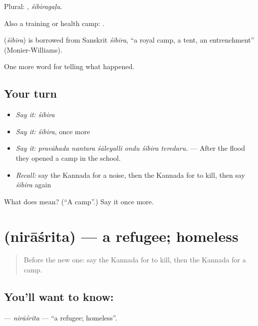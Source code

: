 Plural: , \emph{śibiragaḷu}.

Also a training or health camp:  .

\begin{cousinweb}
\textbf{} (\emph{śibira}) is borrowed from Sanskrit \emph{śibira}, \textquotedblleft{}a royal camp, a tent, an entrenchment\textquotedblright{} (Monier-Williams).
\end{cousinweb}

\begin{grammarlens}[title={What you've built}]
One more word for telling what happened.
\end{grammarlens}

\subsection*{Your turn}
\begin{itemize}
\raggedright
  \item \emph{Say it:} \emph{śibira}
  \item \emph{Say it:} \emph{śibira}, once more
  \item \emph{Say it:} \emph{pravāhada nantara śāleyalli ondu śibira teredaru.} — After the flood they opened a camp in the school.
  \item \emph{Recall:} say the Kannada for a noise, then the Kannada for to kill, then say \emph{śibira} again
\end{itemize}

\begin{tcolorbox}[breakable,colback=teal!4,colframe=teal!35!black,title={Before you move on}]
What does  mean? (\textquotedblleft{}A camp\textquotedblright{}.) Say it once more.
\end{tcolorbox}
\section[\texorpdfstring{\kn{ನಿರಾಶ್ರಿತ} (nirāśrita)}{ನಿರಾಶ್ರಿತ (nirāśrita)}]{ (nirāśrita) — a refugee; homeless}

\label{lesson:KA-C375-nirasrita}



\begin{quote}
Before the new one: say the Kannada for to kill, then the Kannada for a camp.
\end{quote}

\subsection*{You'll want to know: }
\textbf{} — \emph{nirāśrita} — \textquotedblleft{}a refugee; homeless\textquotedblright{}.

